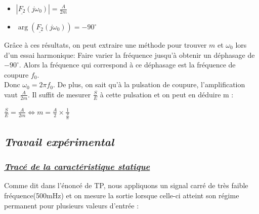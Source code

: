 \documentclass[12pt]{article}
\begin{document}
\begin{itemize}
            \item $|\underline{F_2}(j\omega_0)| = \frac{A}{2m}$
            \item $\arg(\underline{F_2}(j\omega_0)) = -90^\circ$
\end{itemize}

Grâce à ces résultats, on peut extraire une méthode pour trouver $m$ et $\omega_0$ lors d'un essai harmonique: 
Faire varier la fréquence jusqu'à obtenir un déphasage de $-90^\circ$. Alors la fréquence qui correspond à ce déphasage est la fréquence de coupure $f_0$. 
\\Donc $\omega_0 = 2\pi f_0$. De plus, on sait qu'à la pulsation de coupure, l'amplification vaut $\frac{A}{2m}$. Il suffit de mesurer $\frac{S}{E}$ à cette pulsation et on peut en déduire m :
\begin{center}
    $\frac{S}{E} = \frac{A}{2m} \Leftrightarrow m = \frac{A}{2}\times \frac{1}{\frac{S}{E}}$
\end{center}

\subsection{\itshape Travail expérimental}

\subsubsection{\underline{\textit{Tracé de la caractéristique statique} }}
Comme dit dans l'énoncé de TP, nous appliquons un signal carré de très faible fréquence(500mHz) et on mesure la sortie  lorsque celle-ci atteint son régime permanent pour plusieurs valeurs d'entrée : 
\end{document}
